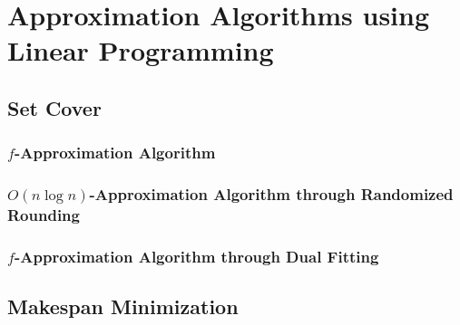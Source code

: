 \chapter{Approximation Algorithms using Linear Programming}
\section{Set Cover}
\subsection{\texorpdfstring{$f$}{f}-Approximation Algorithm}
\subsection{\texorpdfstring{$O(n\log n)$}{O(nlogn)}-Approximation Algorithm through Randomized Rounding}
\subsection{\texorpdfstring{$f$}{f}-Approximation Algorithm through Dual Fitting}
\section{Makespan Minimization}
